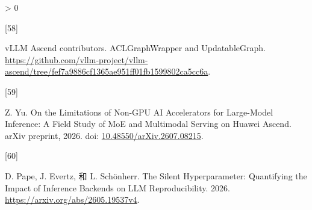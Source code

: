 \documentclass[
  UTF8,
  zihao=5]{ctexart}
\newlength{\cslhangindent}
\newlength{\csllabelwidth}
\newenvironment{CSLReferences}[2] %
 {%
  \setlength{\parindent}{0pt}
  \ifodd #1 \everypar{\setlength{\hangindent}{\cslhangindent}}\ignorespaces\fi
  \ifnum #2 > 0
  \setlength{\parskip}{#2\baselineskip}
  \fi
 }%
 {}
\newcommand{\CSLLeftMargin}[1]{\parbox[t]{\csllabelwidth}{#1}}
\newcommand{\CSLRightInline}[1]{\parbox[t]{\linewidth - \csllabelwidth}{#1}\par}
\begin{document}
\begin{CSLReferences}{0}{0}
\leavevmode{}%
\CSLLeftMargin{{[}58{]} }%
\CSLRightInline{vLLM Ascend contributors. {ACLGraphWrapper and
UpdatableGraph}.
\url{https://github.com/vllm-project/vllm-ascend/tree/fef7a9886cf1365ae951ff01fb1599802ca5cc6a}.}

\leavevmode{}%
\CSLLeftMargin{{[}59{]} }%
\CSLRightInline{Z. Yu. {On the Limitations of Non-GPU AI Accelerators
for Large-Model Inference: A Field Study of MoE and Multimodal Serving
on Huawei Ascend}. arXiv preprint, 2026. doi:
\href{https://doi.org/10.48550/arXiv.2607.08215}{10.48550/arXiv.2607.08215}.}

\leavevmode{}%
\CSLLeftMargin{{[}60{]} }%
\CSLRightInline{D. Pape, J. Evertz, 和 L. Schönherr. The Silent
Hyperparameter: Quantifying the Impact of Inference Backends on LLM
Reproducibility. 2026. \url{https://arxiv.org/abs/2605.19537v4}.}

\end{CSLReferences}
\end{document}

